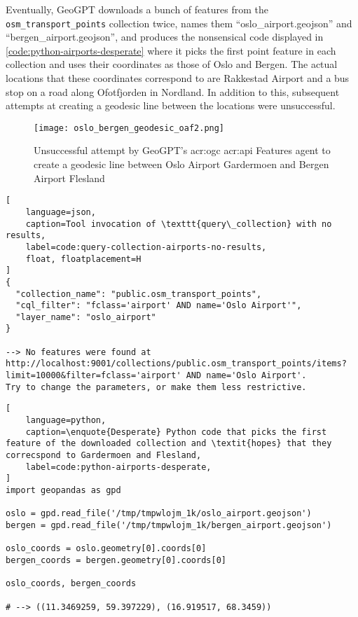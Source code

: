 Eventually, GeoGPT downloads a bunch of features from the \texttt{osm\_transport\_points} collection twice, names them \enquote{oslo\_airport.geojson} and \enquote{bergen\_airport.geojson}, and produces the nonsensical code displayed in \autoref{code:python-airports-desperate} where it picks the first point feature in each collection and uses their coordinates as those of Oslo and Bergen. The actual locations that these coordinates correspond to are Rakkestad Airport and a bus stop on a road along Ofotfjorden in Nordland. In addition to this, subsequent attempts at creating a geodesic line between the locations were unsuccessful.

\begin{figure}[htbp]
    \centering
    \texttt{[image: oslo\_bergen\_geodesic\_oaf2.png]}
    \caption{Unsuccessful attempt by GeoGPT's \acrshort{acr:ogc} \acrshort{acr:api} Features agent to create a geodesic line between Oslo Airport Gardermoen and Bergen Airport Flesland}
    \label{fig:oaf-geodesic-unsuccessful}
\end{figure}

\FloatBarrier

\begin{lstlisting}[
    language=json,
    caption=Tool invocation of \texttt{query\_collection} with no results,
    label=code:query-collection-airports-no-results,
    float, floatplacement=H
]
{
  "collection_name": "public.osm_transport_points",
  "cql_filter": "fclass='airport' AND name='Oslo Airport'",
  "layer_name": "oslo_airport"
}

--> No features were found at http://localhost:9001/collections/public.osm_transport_points/items?limit=10000&filter=fclass='airport' AND name='Oslo Airport'.
Try to change the parameters, or make them less restrictive.
\end{lstlisting}

\FloatBarrier

\begin{lstlisting}[
    language=python,
    caption=\enquote{Desperate} Python code that picks the first feature of the downloaded collection and \textit{hopes} that they correcspond to Gardermoen and Flesland,
    label=code:python-airports-desperate,
]
import geopandas as gpd

oslo = gpd.read_file('/tmp/tmpwlojm_1k/oslo_airport.geojson')
bergen = gpd.read_file('/tmp/tmpwlojm_1k/bergen_airport.geojson')

oslo_coords = oslo.geometry[0].coords[0]
bergen_coords = bergen.geometry[0].coords[0]

oslo_coords, bergen_coords   

# --> ((11.3469259, 59.397229), (16.919517, 68.3459))
\end{lstlisting}

